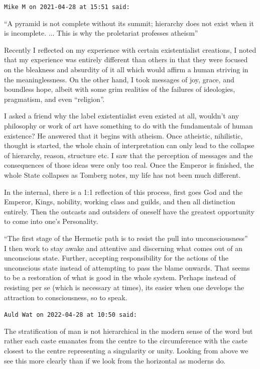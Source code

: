\begin{footnotesize}
\begin{sffamily}
\texttt{Mike M on 2021-04-28 at 15:51 said:}

``A pyramid is not complete without its summit; hierarchy does not exist when it is incomplete. ... This is why the proletariat professes atheism''

Recently I reflected on my experience with certain existentialist creations, I noted that my experience was entirely different than others in that they were focused on the bleakness and absurdity of it all which would affirm a human striving in the meaninglessness. On the other hand, I took messages of joy, grace, and boundless hope, albeit with some grim realities of the failures of ideologies, pragmatism, and even ``religion''.

I asked a friend why the label existentialist even existed at all, wouldn't any philosophy or work of art have something to do with the fundamentals of human existence? He answered that it begins with atheism. Once atheistic, nihilistic, thought is started, the whole chain of interpretation can only lead to the collapse of hierarchy, reason, structure etc. I saw that the perception of messages and the consequences of those ideas were only too real. Once the Emperor is finished, the whole State collapses as Tomberg notes, my life has not been much different.

In the internal, there is a 1:1 reflection of this process, first goes God and the Emperor, Kings, nobility, working class and guilds, and then all distinction entirely. Then the outcasts and outsiders of oneself have the greatest opportunity to come into one's Personality.

``The first stage of the Hermetic path is to resist the pull into unconsciousness''\\ I then work to stay awake and attentive and discerning what comes out of an unconscious state. Further, accepting responsibility for the actions of the unconscious state instead of attempting to pass the blame onwards. That seems to be a restoration of what is good in the whole system. Perhaps instead of resisting per se (which is necessary at times), its easier when one develops the attraction to consciousness, so to speak.

\hfill

\texttt{Auld Wat on 2022-04-28 at 10:50 said:}

The stratification of man is not hierarchical in the modern sense of the word but rather each caste emanates from the centre to the circumference with the caste closest to the centre representing a singularity or unity. Looking from above we see this more clearly than if we look from the horizontal as moderns do.


\end{sffamily}
\end{footnotesize}
